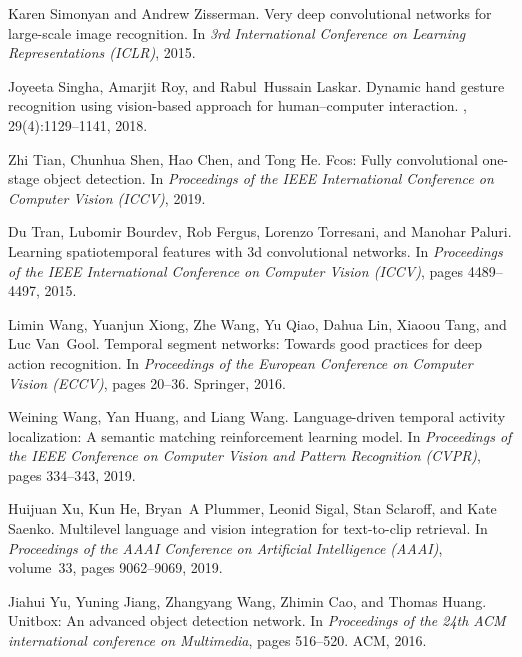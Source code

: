 \documentclass[10pt,twocolumn,letterpaper]{article}
\begin{document}
\begin{thebibliography}{10}
	Karen Simonyan and Andrew Zisserman.
	\newblock Very deep convolutional networks for large-scale image recognition.
	\newblock In {\em 3rd International Conference on Learning Representations
		(ICLR)}, 2015.
	
	Joyeeta Singha, Amarjit Roy, and Rabul~Hussain Laskar.
	\newblock Dynamic hand gesture recognition using vision-based approach for
	human--computer interaction.
	, 29(4):1129--1141, 2018.
	
	Zhi Tian, Chunhua Shen, Hao Chen, and Tong He.
	\newblock Fcos: Fully convolutional one-stage object detection.
	\newblock In {\em Proceedings of the IEEE International Conference on Computer
		Vision (ICCV)}, 2019.
	
	Du Tran, Lubomir Bourdev, Rob Fergus, Lorenzo Torresani, and Manohar Paluri.
	\newblock Learning spatiotemporal features with 3d convolutional networks.
	\newblock In {\em Proceedings of the IEEE International Conference on Computer
		Vision (ICCV)}, pages 4489--4497, 2015.
	
	Limin Wang, Yuanjun Xiong, Zhe Wang, Yu Qiao, Dahua Lin, Xiaoou Tang, and Luc
	Van~Gool.
	\newblock Temporal segment networks: Towards good practices for deep action
	recognition.
	\newblock In {\em Proceedings of the European Conference on Computer Vision
		(ECCV)}, pages 20--36. Springer, 2016.
	
	Weining Wang, Yan Huang, and Liang Wang.
	\newblock Language-driven temporal activity localization: A semantic matching
	reinforcement learning model.
	\newblock In {\em Proceedings of the IEEE Conference on Computer Vision and
		Pattern Recognition (CVPR)}, pages 334--343, 2019.
	
	Huijuan Xu, Kun He, Bryan~A Plummer, Leonid Sigal, Stan Sclaroff, and Kate
	Saenko.
	\newblock Multilevel language and vision integration for text-to-clip
	retrieval.
	\newblock In {\em Proceedings of the AAAI Conference on Artificial Intelligence
		(AAAI)}, volume~33, pages 9062--9069, 2019.
	
	Jiahui Yu, Yuning Jiang, Zhangyang Wang, Zhimin Cao, and Thomas Huang.
	\newblock Unitbox: An advanced object detection network.
	\newblock In {\em Proceedings of the 24th ACM international conference on
		Multimedia}, pages 516--520. ACM, 2016.
	

\end{thebibliography}
\end{document}
